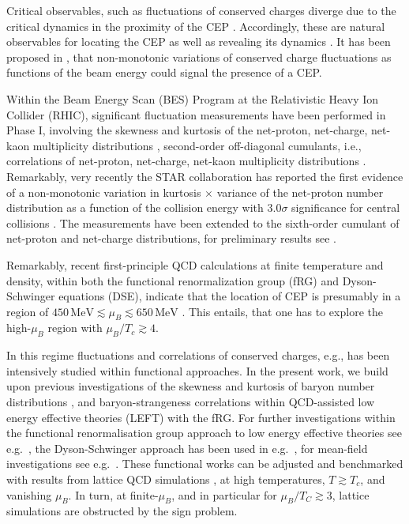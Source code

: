 \documentclass[%
reprint,
superscriptaddress,
showpacs,preprintnumbers,
amsmath,amssymb,
aps,
prd,
]{revtex4-1}
\begin{document}
	Critical observables, such as fluctuations of conserved charges diverge due to the critical dynamics in the proximity of the CEP \cite{Stephanov:2008qz}. Accordingly, these are natural observables for locating the CEP  as well as revealing its dynamics \cite{Luo:2017faz,Adam:2020unf}. It has been proposed in \cite{Stephanov:1999zu, Stephanov:2008qz, Stephanov:2011pb}, that non-monotonic variations of conserved charge fluctuations as functions of the beam energy could signal the presence of a CEP. 
	
	Within the Beam Energy Scan (BES) Program at the Relativistic Heavy Ion Collider (RHIC), significant fluctuation measurements have been performed in Phase I, involving the skewness and kurtosis of the net-proton, net-charge, net-kaon multiplicity distributions  \cite{Adamczyk:2013dal,Adamczyk:2014fia,Luo:2015ewa,Adamczyk:2017wsl}, second-order off-diagonal cumulants, i.e., correlations of net-proton, net-charge, net-kaon multiplicity distributions \cite{Adam:2019xmk}. Remarkably, very recently the STAR collaboration has reported the first evidence of a non-monotonic variation in kurtosis $\times$ variance of the net-proton number distribution as a function of the collision energy with $3.0\sigma$ significance for central collisions \cite{Adam:2020unf}. The measurements have been extended to the sixth-order cumulant of net-proton and net-charge distributions, for preliminary results see  \cite{Nonaka:2020crv,Pandav:2020uzx}.
	
	Remarkably, recent first-principle QCD calculations at finite temperature and density, within both the functional renormalization group (fRG) and Dyson-Schwinger equations (DSE), indicate that the location of CEP is presumably in a region of $450\,\mathrm{MeV} \lesssim\mu_B\lesssim 650\,\mathrm{MeV}$ \cite{Fischer:2018sdj,Fu:2019hdw,Isserstedt:2019pgx,Gao:2020qsj, Gao:2020fbl}. This entails, that one has to explore the high-$\mu_B$ region with $\mu_B/T_c\gtrsim 4$. 
	
	In this regime fluctuations and correlations of conserved charges, e.g., has been intensively studied within functional approaches. In the present work, we build upon previous investigations  of the skewness and kurtosis of baryon number distributions \cite{Fu:2015naa,Fu:2015amv,Fu:2016tey}, and baryon-strangeness correlations \cite{Fu:2018qsk,Fu:2018swz} within QCD-assisted low energy effective theories (LEFT) with the fRG. For further  investigations within the functional renormalisation group approach to low energy effective theories see e.g.\  \cite{Skokov:2010wb,Skokov:2010uh,Morita:2014fda,Almasi:2017bhq}, the Dyson-Schwinger approach has been used in e.g.\  \cite{Xin:2014ela,Isserstedt:2019pgx}, for mean-field investigations see e.g.\ \cite{Fu:2009wy,Fu:2010ay,Karsch:2010hm,Schaefer:2011ex,Li:2018ygx}. These functional works can be adjusted and benchmarked with results from lattice QCD simulations  \cite{Bazavov:2012vg,Borsanyi:2013hza,Borsanyi:2014ewa,Bazavov:2017dus,Bazavov:2017tot,Borsanyi:2018grb,Bazavov:2020bjn}, at high temperatures, $T\gtrsim T_c$, and vanishing $\mu_B$. In turn, at finite-$\mu_B$, and in particular for $\mu_B/T_C\gtrsim 3$, lattice simulations are obstructed by the sign problem. 
	
\end{document}
